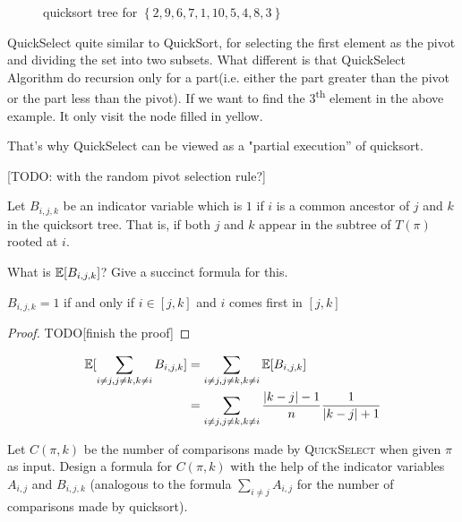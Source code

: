 \documentclass[11pt,a4paper,oneside]{article}
\newcommand{\nth}[1]{#1\textsuperscript{th}}
\newcommand{\E}{\mathop{\mathbb{E\/}}}
\begin{document}
\begin{problem}{5}
\begin{figure}[H]
\begin{tikzpicture}
	
	\end{tikzpicture}
	\caption{quicksort tree for \(\left \{ 2, 9, 6, 7, 1, 10, 5, 4, 8, 3\right \}\)}
\end{figure}

QuickSelect quite similar to QuickSort, for selecting the first element as the pivot and dividing the set into two subsets. What different is that QuickSelect Algorithm do recursion only for a part(i.e. either the part greater than the pivot or the part less than the pivot). If we want to find the \nth{\(3\)} element in the above example. It only visit the node filled in yellow.

That's why QuickSelect can be viewed as a "partial execution'' of quicksort.

[TODO: with the random pivot selection rule?]

\end{problem}

\begin{problem}{6}
\statement
Let $B_{i,j,k}$ be an indicator variable which is $1$ if $i$ is a common ancestor
of $j$ and $k$ in the quicksort tree. That is, if both $j$ and $k$ appear in the 
subtree of $T(\pi)$ rooted at $i$.

What is $\E[B_{i,j,k}]$? Give a succinct formula for this.

\solution
\begin{lemma}
	\(B_{i, j, k} = 1\) if and only if \(i \in [j, k]\) and \(i\) comes first in \([j, k]\)
\end{lemma}
\begin{proof}
	TODO[finish the proof]
\end{proof}

\[
	\begin{split}
		\E[\sum_{i \not= j, j \not= k, k \not= i}B_{i, j, k}] &= \sum_{i \not= j, j \not= k, k \not= i} \E[B_{i,j,k}] \\
		&= \sum_{i \not= j, j \not= k, k \not= i} \frac{|k - j| - 1}{n} \frac{1}{|k - j| + 1} \\
	\end{split}
\]
\end{problem}

\begin{problem}{7}
\statement
Let $C(\pi,k)$ be the number of comparisons made by \textsc{QuickSelect} when given
$\pi$ as input. Design a formula for $C(\pi,k)$ with the help of the indicator
variables $A_{i,j}$ and $B_{i,j,k}$ (analogous to the formula 
$\sum_{i \ne j} A_{i,j}$ for the number of comparisons made by quicksort).
\end{problem}
\end{document}
